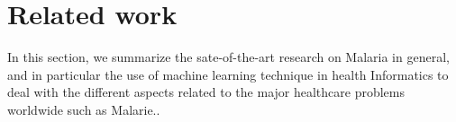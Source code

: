 \section{Related work}\label{related_work}
In this section, we summarize the sate-of-the-art research on Malaria in general, and in particular the
use of machine learning technique in health Informatics to deal with the different aspects related to the 
major healthcare problems worldwide such as Malarie..
